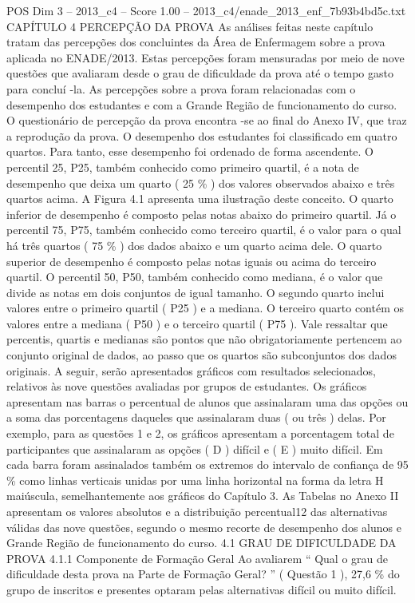 \begin{textsample}{POS Dim 3 – 2013\_c4 – Score 1.00 – 2013\_c4/enade\_2013\_enf\_7b93b4bd5c.txt}  \label{ex:f3_pos_164}
CAPÍTULO 4 PERCEPÇÃO DA PROVA As análises feitas neste capítulo tratam das percepções dos concluintes da Área de Enfermagem sobre a prova aplicada no ENADE/2013.
Estas percepções foram mensuradas por meio de nove questões que avaliaram desde o grau de dificuldade da prova até o tempo gasto para concluí -la.
As percepções sobre a prova foram relacionadas com o desempenho dos estudantes e com a Grande Região de funcionamento do curso.
O questionário de percepção da prova encontra -se ao final do Anexo IV, que traz a reprodução da prova.
O desempenho dos estudantes foi classificado em quatro quartos.
Para tanto, esse desempenho foi ordenado de forma ascendente.
O percentil 25, P25, também conhecido como primeiro quartil, é a nota de desempenho que deixa um quarto ( 25 \% ) dos valores observados abaixo e três quartos acima.
A Figura 4.1 apresenta uma ilustração deste conceito.
O quarto inferior de desempenho é composto pelas notas abaixo do primeiro quartil.
Já o percentil 75, P75, também conhecido como terceiro quartil, é o valor para o qual há três quartos ( 75 \% ) dos dados abaixo e um quarto acima dele.
O quarto superior de desempenho é composto pelas notas iguais ou acima do terceiro quartil.
O percentil 50, P50, também conhecido como mediana, é o valor que divide as notas em dois conjuntos de igual tamanho.
O segundo quarto inclui valores entre o primeiro quartil ( P25 ) e a mediana.
O terceiro quarto contém os valores entre a mediana ( P50 ) e o terceiro quartil ( P75 ).
Vale ressaltar que percentis, quartis e medianas são pontos que não obrigatoriamente pertencem ao conjunto original de dados, ao passo que os quartos são subconjuntos dos dados originais.
A seguir, serão apresentados gráficos com resultados selecionados, relativos às nove questões avaliadas por grupos de estudantes.
Os gráficos apresentam nas barras o percentual de alunos que assinalaram uma das opções ou a soma das porcentagens daqueles que assinalaram duas ( ou três ) delas.
Por exemplo, para as questões 1 e 2, os gráficos apresentam a porcentagem total de participantes que assinalaram as opções ( D ) difícil e ( E ) muito difícil.
Em cada barra foram assinalados também os extremos do intervalo de confiança de 95 \% como linhas verticais unidas por uma linha horizontal na forma da letra H maiúscula, semelhantemente aos gráficos do Capítulo 3.
As Tabelas no Anexo II apresentam os valores absolutos e a distribuição percentual12 das alternativas válidas das nove questões, segundo o mesmo recorte de desempenho dos alunos e Grande Região de funcionamento do curso. 4.1 GRAU DE DIFICULDADE DA PROVA 4.1.1 Componente de Formação Geral Ao avaliarem “ Qual o grau de dificuldade desta prova na Parte de Formação Geral? ” ( Questão 1 ), 27,6 \% do grupo de inscritos e presentes optaram pelas alternativas difícil ou muito difícil.

\end{textsample}
